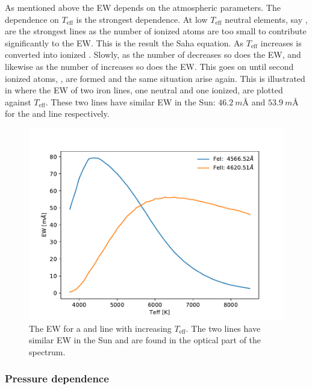 As mentioned above the EW depends on the atmospheric parameters. The dependence
on $T_\mathrm{eff}$ is the strongest dependence. At low $T_\mathrm{eff}$ neutral
elements, say , are the strongest lines as the number of ionized
atoms are too small to contribute significantly to the EW. This is the result
the Saha equation. As $T_\mathrm{eff}$ increases  is converted into
ionized . Slowly, as the number of  decreases so does the
EW, and likewise as the number of  increases so does the EW. This
goes on until second ionized atoms, , are formed and the same
situation arise again. This is illustrated in  where the EW of
two iron lines, one neutral and one ionized, are plotted against
$T_\mathrm{eff}$. These two lines have similar EW in the Sun:
$\SI{46.2}{m}$\AA{} and $\SI{53.9}{m}$\AA{} for the  and 
line respectively.

\begin{figure}[htpb!]
    \centering
    \includegraphics[width=1.0\linewidth]{figures/ewTeff.pdf}
    \caption{The EW for a  and  line with increasing
             $T_\mathrm{eff}$. The two lines have similar EW in the Sun and are
             found in the optical part of the spectrum.}
    \label{fig:ewTeff}
\end{figure}


\subsubsection{Pressure dependence}

